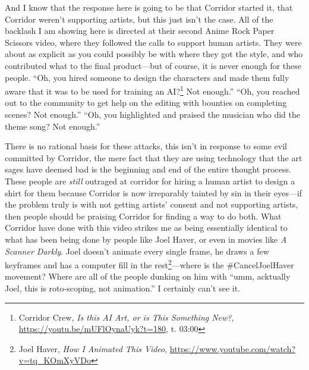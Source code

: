 \documentclass[11pt]{article}
\begin{document}
And I know that the response here is going to be that Corridor started it, that Corridor weren't supporting artists, but this just isn't the case. All of the backlash I am showing here is directed at their second Anime Rock Paper Scissors video, where they followed the calls to support human artists. They were about as explicit as you could possibly be with where they got the style, and who contributed what to the final product---but of course, it is never enough for these people. ``Oh, you hired someone to design the characters and made them fully aware that it was to be used for training an AI?\footnote{Corridor Crew, \emph{Is this AI Art, or is This Something New?}, \url{https://youtu.be/mUFlOynaUyk?t=180}, t. 03:00} Not enough.'' ``Oh, you reached out to the community to get help on the editing with bounties on completing scenes? Not enough.'' ``Oh, you highlighted and praised the musician who did the theme song? Not enough.''

There is no rational basis for these attacks, this isn't in response to some evil committed by Corridor, the mere fact that they are using technology that the art sages have deemed bad is the beginning and end of the entire thought process. These people are \emph{still} outraged at corridor for hiring a human artist to design a shirt for them because Corridor is now irreparably tainted by sin in their eyes---if the problem truly is with not getting artists' consent and not supporting artists, then people should be praising Corridor for finding a way to do both. What Corridor have done with this video strikes me as being essentially identical to what has been being done by people like Joel Haver, or even in movies like \emph{A Scanner Darkly}. Joel doesn't animate every single frame, he draws a few keyframes and has a computer fill in the rest\footnote{Joel Haver, \emph{How I Animated This Video}, \url{https://www.youtube.com/watch?v=tq\_KOmXyVDo}}---where is the \#CancelJoelHaver movement? Where are all of the people dunking on him with ``umm, acktually Joel, this is roto-scoping, not animation.'' I certainly can't see it.
\end{document}
